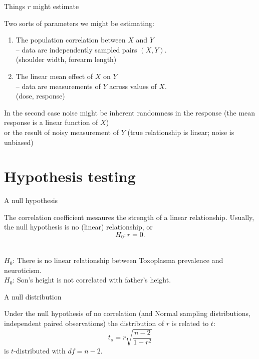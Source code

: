 \begin{frame}{Things $r$ might estimate}

  Two sorts of parameters we might be estimating:
  \begin{enumerate}
    \item The population correlation between $X$ and $Y$ \\
      -- data are independently sampled pairs $(X,Y)$. \\
       (shoulder width, forearm length)
    \item The linear mean effect of $X$ on $Y$ \\
      -- data are measurements of $Y$ across values of $X$. \\
       (dose, response) 
  \end{enumerate}

    \vspace{2em}

    In the second case noise might be inherent randomness in the response
    (the \alert{mean response} is a linear function of $X$) \\
    or the result of noisy measurement of $Y$ (true relationship is linear; noise is unbiased)

\end{frame}

\section{Hypothesis testing}

\begin{frame}{A null hypothesis}

  The correlation coefficient mesaures the strength of a linear relationship.
  Usually, the null hypothesis is \alert{no (linear) relationship}, or
  \[ H_0 : r=0 . \]


    \vspace{2em}

    \\
    \vspace{1em}
    $H_0$: There is no linear relationship between Toxoplasma prevalence and neuroticism.\\
    \vspace{1em}
    $H_0$: Son's height is not correlated with father's height.

\end{frame}

\begin{frame}{A null distribution}

  Under the null hypothesis of no correlation 
  {\small (and Normal sampling distributions, independent paired observations)}
  the distribution of $r$ is related to $t$:
  \[
    t_s = r \sqrt{\frac{n-2}{1-r^2}}
  \]
  is $t$-distributed with $df=n-2$.



\end{frame}

